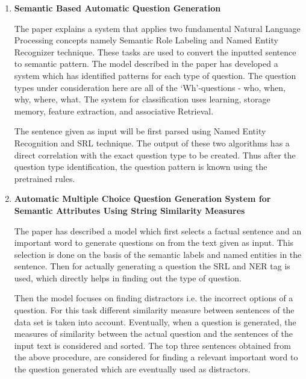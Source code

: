 \begin{enumerate}[align=left]
\item \textbf{Semantic Based Automatic Question Generation}
	
	The paper explains a system that applies two fundamental Natural
	Language Processing concepts namely Semantic Role Labeling and Named
	Entity Recognizer technique. These tasks are used to convert the
	inputted sentence to semantic pattern. The model described in the paper
	has developed a system which has identified patterns for each type of
	question. The question types under consideration here are all of the
	‘Wh’-questions - who, when, why, where, what.  The system for
	classification uses learning, storage memory, feature extraction, and
	associative Retrieval.  

The sentence given as input will be first parsed using Named Entity Recognition
and SRL technique. The output of these two algorithms has a direct correlation
with the exact question type to be created. Thus after the question type
identification, the question pattern is known using the pretrained rules. 

\item \textbf{Automatic Multiple Choice Question Generation System for Semantic
	Attributes Using String Similarity Measures}
	
	The paper has described a model which first selects a factual sentence
	and an important word to generate questions on from the text given as
	input. This selection is done on the basis of the semantic labels and
	named entities in the sentence. Then for actually generating a question
	the SRL and NER tag is used, which directly helps in finding out the
	type of question. 

Then the model focuses on finding distractors i.e. the incorrect options of a
question. For this task  different similarity measure between sentences of the
data set is taken into account. Eventually, when a question is generated, the
measures of similarity between the actual question and the sentences of the
input text is considered and sorted. The top three sentences obtained from the
above procedure, are considered for finding a relevant important word to the
question generated which are eventually used as distractors. 

\end{enumerate}

